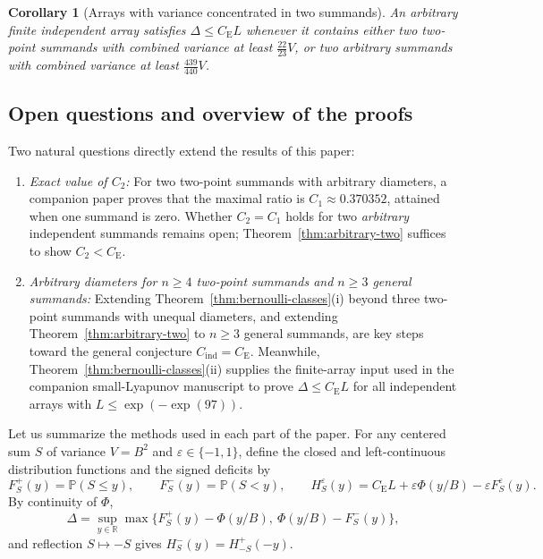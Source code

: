 \documentclass[11pt]{article}
\numberwithin{equation}{section}
\newtheorem{corollary}[theorem]{Corollary}
\theoremstyle{definition}
\theoremstyle{remark}
\newcommand{\Pp}{\mathbb P}
\newcommand{\R}{\mathbb R}
\newcommand{\be}{C_{\mathrm E}}
\newcommand{\Cind}{C_{\mathrm{ind}}}
\begin{document}
\begin{corollary}[Arrays with variance concentrated in two summands]\label{cor:dominance-main}
An arbitrary finite independent array satisfies $\Delta\le\be L$ whenever it
contains either two two-point summands with combined variance at least
$\frac{22}{23}V$, or two arbitrary summands with combined variance at least
$\frac{439}{440}V$.
\end{corollary}

\subsection{Open questions and overview of the proofs}

Two natural questions directly extend the results of this paper:
\begin{enumerate}[label=(\arabic*),leftmargin=2em]
\item \emph{Exact value of $C_2$:} For two two-point summands with arbitrary
diameters, a companion paper proves that the maximal ratio is $C_1\approx0.370352$,
attained when one summand is zero. Whether $C_2=C_1$ holds for two
\emph{arbitrary} independent summands remains open; Theorem~\ref{thm:arbitrary-two}
suffices to show $C_2<\be$.
\item \emph{Arbitrary diameters for $n\ge4$ two-point summands and $n\ge3$
general summands:} Extending Theorem~\ref{thm:bernoulli-classes}(i) beyond
three two-point summands with unequal diameters, and extending
Theorem~\ref{thm:arbitrary-two} to $n\ge3$ general summands, are key steps
toward the general conjecture $\Cind=\be$. Meanwhile,
Theorem~\ref{thm:bernoulli-classes}(ii) supplies the finite-array input used
in the companion small-Lyapunov manuscript to prove $\Delta\le\be L$ for all
independent arrays with $L\le\exp(-\exp(97))$.
\end{enumerate}

Let us summarize the methods used in each part of the paper. For any centered
sum $S$ of variance $V=B^2$ and $\varepsilon\in\{-1,1\}$, define the closed
and left-continuous distribution functions and the signed deficits by
\[
 F_S^+(y)=\Pp(S\le y),\qquad F_S^-(y)=\Pp(S<y),\qquad
 H_S^\varepsilon(y)=\be L+\varepsilon\Phi(y/B)-\varepsilon F_S^\varepsilon(y).
\]
By continuity of $\Phi$,
\begin{equation}\label{eq:one-sided}
 \Delta=\sup_{y\in\R}\max\{F_S^+(y)-\Phi(y/B),\ \Phi(y/B)-F_S^-(y)\},
\end{equation}
and reflection $S\mapsto-S$ gives $H_S^-(y)=H_{-S}^+(-y)$.
\end{document}
